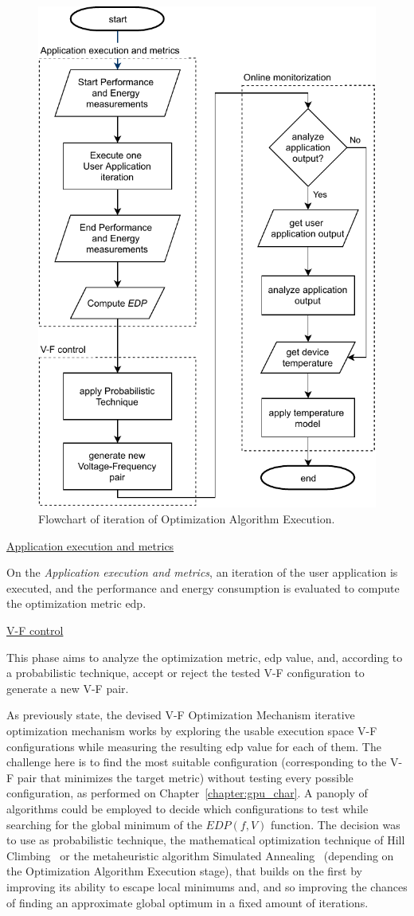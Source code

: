 \begin{figure}[h]
  \centering
  \includegraphics[height=0.95\textwidth]{Figures/Optimization/flowchart.pdf}
  \caption{Flowchart of iteration of Optimization Algorithm Execution.}
  \label{fig:flowchart}
\end{figure}

\bigskip
\noindent\underline{Application execution and metrics}
\bigskip

On the \textit{Application execution and metrics}, an iteration of the user application is executed, and the performance and energy consumption is evaluated to compute the optimization metric \acrshort{edp}. 

\bigskip
\noindent\underline{V-F control}
\bigskip


This phase aims to analyze the optimization metric, \acrshort{edp} value, and, according to a probabilistic technique, accept or reject the tested V-F configuration to generate a new V-F pair.

As previously state, the devised V-F Optimization Mechanism iterative optimization mechanism works by exploring the usable execution space V-F configurations while measuring the resulting \acrshort{edp} value for each of them. The challenge here is to find the most suitable configuration (corresponding to the V-F pair that minimizes the target metric) without testing every possible configuration, as performed on Chapter~\ref{chapter:gpu_char}. A panoply of algorithms could be employed to decide which configurations to test while searching for the global minimum of the $EDP(f, V)$ function. The decision was to use as probabilistic technique, the mathematical optimization technique of Hill Climbing~\cite{vaughan_simultaneous_2005} or the metaheuristic algorithm Simulated Annealing~\cite{kirkpatrick_optimization_1983} (depending on the Optimization Algorithm Execution stage), that builds on the first by improving its ability to escape local minimums and, and so improving the chances of finding an approximate global optimum in a fixed amount of iterations. 

